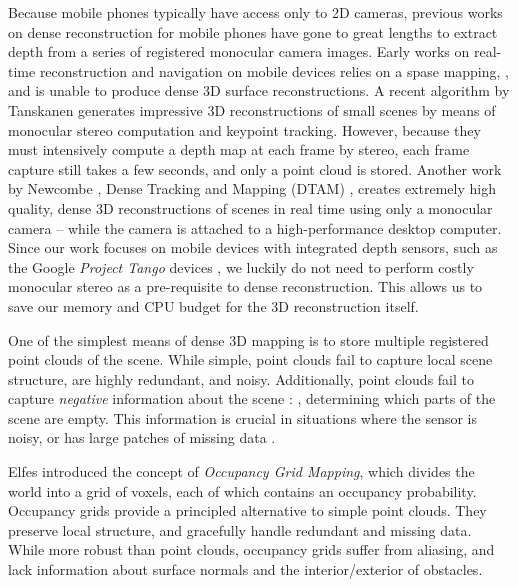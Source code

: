 \documentclass[10pt,twocolumn,letterpaper]{article}
\begin{document}
Because mobile phones typically have access only to 2D cameras, previous works
on dense reconstruction for mobile phones have gone to great lengths to extract
depth from a series of registered monocular camera images.  Early works on
real-time reconstruction and navigation on mobile devices relies on a spase
mapping, \cite{KleinSparse}, and is unable to produce dense 3D surface
reconstructions.  A recent algorithm by Tanskanen \etal
\cite{TanskanenMetric} generates impressive 3D reconstructions of small scenes
by means of monocular stereo computation and keypoint tracking. However,
because they \cite{TanskanenMetric} must intensively compute a depth map at
each frame by stereo, each frame capture still takes a few seconds, and only a
point cloud is stored. Another work by Newcombe \etal, Dense Tracking and
Mapping (DTAM) \cite{DTAM},  creates extremely high quality, dense 3D
reconstructions of scenes in real time using only a monocular camera -- while
the camera is attached to a high-performance desktop computer. Since our work
focuses on mobile devices with integrated depth sensors, such as the Google
\emph{Project Tango} devices \cite{Tango}, we luckily do not need to perform
costly monocular stereo as a pre-requisite to dense reconstruction. This allows
us to save our memory and CPU budget for the 3D reconstruction itself.

One of the simplest means of dense 3D mapping is to  store multiple registered
point clouds of the scene. While simple, point clouds fail to capture local
scene structure, are highly redundant, and noisy. Additionally, point clouds
fail to capture \emph{negative} information about the scene :  \ie, determining
which parts of the scene are empty. This information is crucial in situations
where the sensor is noisy, or has large patches of missing data \cite{Klingensmith2014}.

Elfes \cite{Elfes1989} introduced the concept of \emph{Occupancy Grid
Mapping}, which divides the world into a grid of voxels, each of which contains
an occupancy probability. Occupancy grids provide a principled alternative to
simple point clouds. They preserve local structure, and gracefully handle
redundant and missing data.  While more robust than point clouds, occupancy
grids suffer from aliasing, and lack information about surface normals and the
interior/exterior of obstacles.

\end{document}
